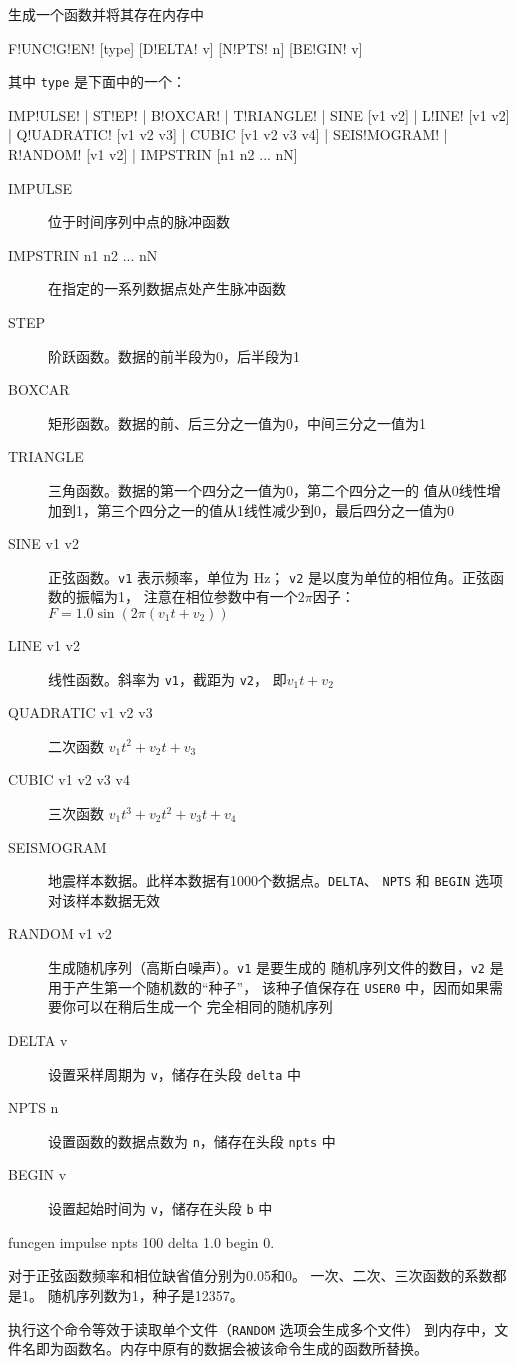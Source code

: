 \label{cmd:funcgen}

生成一个函数并将其存在内存中

\begin{SACSTX}
F!UNC!G!EN! [type] [D!ELTA! v] [N!PTS! n] [BE!GIN! v]
\end{SACSTX}
其中 \texttt{type} 是下面中的一个：
\begin{SACSTX}
IMP!ULSE! | ST!EP! | B!OXCAR! | T!RIANGLE! | SINE [v1 v2] | L!INE! [v1 v2] |
Q!UADRATIC! [v1 v2 v3] | CUBIC [v1 v2 v3 v4] | SEIS!MOGRAM! |
R!ANDOM! [v1 v2] | IMPSTRIN  [n1 n2 ... nN]
\end{SACSTX}

\begin{description}
\item [IMPULSE] 位于时间序列中点的脉冲函数
\item [IMPSTRIN n1 n2 ... nN] 在指定的一系列数据点处产生脉冲函数
\item [STEP] 阶跃函数。数据的前半段为0，后半段为1
\item [BOXCAR] 矩形函数。数据的前、后三分之一值为0，中间三分之一值为1
\item [TRIANGLE] 三角函数。数据的第一个四分之一值为0，第二个四分之一的
    值从0线性增加到1，第三个四分之一的值从1线性减少到0，最后四分之一值为0
\item [SINE v1 v2] 正弦函数。\texttt{v1} 表示频率，单位为 \si{\Hz}；
    \texttt{v2} 是以度为单位的相位角。正弦函数的振幅为1，
    注意在相位参数中有一个$2\pi$因子：$F = 1.0 \sin (2\pi (v_1t+v_2))$
\item [LINE v1 v2] 线性函数。斜率为 \texttt{v1}，截距为 \texttt{v2}，
    即$ v_1 t + v_2 $
\item [QUADRATIC v1 v2 v3] 二次函数 $v_1 t^{2} + v_2 t + v_3 $
\item [CUBIC v1 v2 v3 v4] 三次函数 $ v_1 t^{3} + v_2 t^2 + v_3t + v_4 $
\item [SEISMOGRAM] 地震样本数据。此样本数据有1000个数据点。\texttt{DELTA}、
    \texttt{NPTS} 和 \texttt{BEGIN} 选项对该样本数据无效
\item [RANDOM v1 v2] 生成随机序列（高斯白噪声）。\texttt{v1} 是要生成的
    随机序列文件的数目，\texttt{v2} 是用于产生第一个随机数的``种子''，
    该种子值保存在 \texttt{USER0} 中，因而如果需要你可以在稍后生成一个
    完全相同的随机序列
\item [DELTA v] 设置采样周期为 \texttt{v}，储存在头段 \texttt{delta} 中
\item [NPTS n] 设置函数的数据点数为 \texttt{n}，储存在头段 \texttt{npts} 中
\item [BEGIN v] 设置起始时间为 \texttt{v}，储存在头段 \texttt{b} 中
\end{description}

\begin{SACDFT}
funcgen impulse npts 100 delta 1.0 begin 0.
\end{SACDFT}
对于正弦函数频率和相位缺省值分别为0.05和0。
一次、二次、三次函数的系数都是1。
随机序列数为1，种子是12357。

执行这个命令等效于读取单个文件（\texttt{RANDOM} 选项会生成多个文件）
到内存中，文件名即为函数名。内存中原有的数据会被该命令生成的函数所替换。
